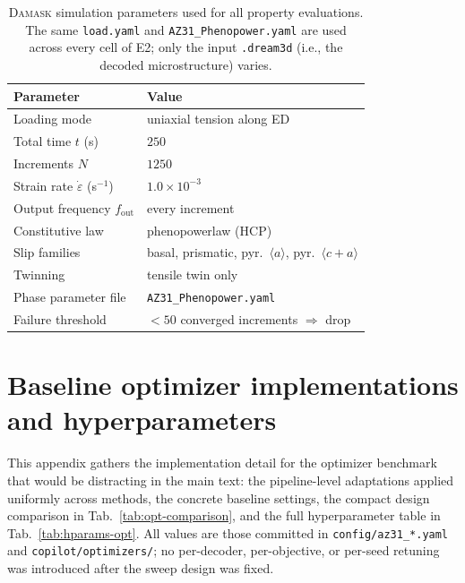 \documentclass{article}
\newcommand{\damask}{\textsc{Damask}}
\begin{document}
\begin{table}[!ht]
  \caption{\damask{} simulation parameters used for all property evaluations. The same \texttt{load.yaml} and \texttt{AZ31\_Phenopower.yaml} are used across every cell of E2; only the input \texttt{.dream3d} (i.e., the decoded microstructure) varies.}
  \label{tab:hparams-sim}
  \centering
  \small
  \begin{tabular}{ll}
    \toprule
    Parameter & Value \\
    \midrule
    Loading mode                  & uniaxial tension along ED \\
    Total time $t$ (s)            & $250$ \\
    Increments $N$                & $1250$ \\
    Strain rate $\dot{\varepsilon}$ (s$^{-1}$) & $1.0 \times 10^{-3}$ \\
    Output frequency $f_{\mathrm{out}}$ & every increment \\
    Constitutive law              & phenopowerlaw (HCP) \\
    Slip families                 & basal, prismatic, pyr.\ $\langle a\rangle$, pyr.\ $\langle c{+}a\rangle$ \\
    Twinning                      & tensile twin only \\
    Phase parameter file          & \texttt{AZ31\_Phenopower.yaml} \\
    Failure threshold             & ${<}50$ converged increments $\Rightarrow$ drop \\
    \bottomrule
  \end{tabular}
\end{table}

\section{Baseline optimizer implementations and hyperparameters}
\label{app:baselines}

This appendix gathers the implementation detail for the optimizer benchmark that would be distracting in the main text: the pipeline-level adaptations applied uniformly across methods, the concrete baseline settings, the compact design comparison in Tab.~\ref{tab:opt-comparison}, and the full hyperparameter table in Tab.~\ref{tab:hparams-opt}. All values are those committed in \texttt{config/az31\_*.yaml} and \texttt{copilot/optimizers/}; no per-decoder, per-objective, or per-seed retuning was introduced after the sweep design was fixed.
\end{document}

